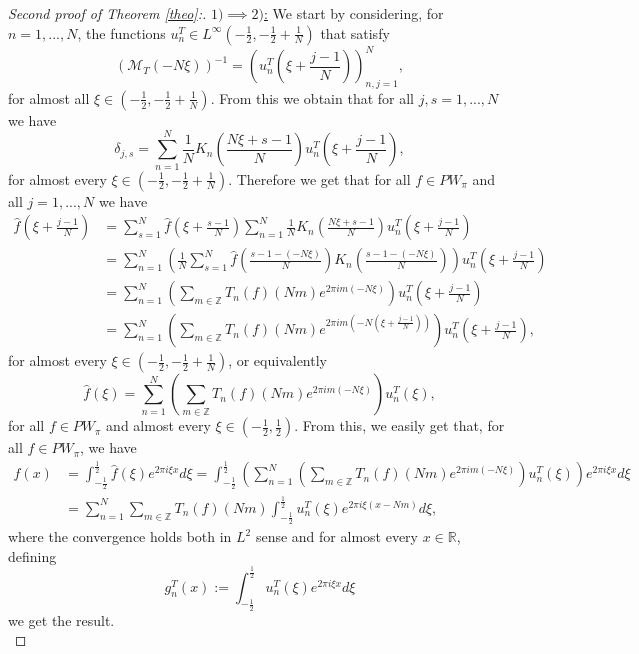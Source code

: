 \documentclass[reqno]{amsart}
\theoremstyle{plain}
\theoremstyle{definition}
\numberwithin{equation}{section}
\newcommand{\Z}{{\mathbb Z}}
\newcommand{\R}{{\mathbb R}}
\newcommand{\pa}[1]{\left(#1\right)}
\begin{document}
\begin{proof}[Second proof of Theorem \ref{theo}:] \quad
	
	\underline{$1)\implies 2)$:} We start by considering, for $n=1,...,N$, the functions 
    $u^T_n\in L^\infty\pa{-\frac{1}{2},-\frac{1}{2}+\frac{1}{N}}$ that satisfy
    $$\pa{\mathcal{M}_T\pa{-N \xi}}^{-1}=\pa{u^T_n\pa{\xi+\frac{j-1}{N}}}_{n,j=1}^N,$$
    for almost all $\xi\in \pa{-\frac{1}{2},-\frac{1}{2}+\frac{1}{N}}$. From this we obtain 
    that for all $j,s=1,...,N$ we have
    $$\delta_{j,s}=\sum_{n=1}^N \frac{1}{N} K_n\pa{\frac{N\xi+s-1}{N}}u^T_n\pa{\xi+\frac{j-1}{N}},$$
    for almost every $\xi\in \pa{-\frac{1}{2},-\frac{1}{2}+\frac{1}{N}}$. Therefore we get 
    that for all $f\in PW_\pi$ and all $j=1,...,N$ we have
    \begin{align*}
        \widehat{f}\pa{\xi+\frac{j-1}{N}}
        &=\sum_{s=1}^N \widehat{f}\pa{\xi+\frac{s-1}{N}}
        \sum_{n=1}^N \frac{1}{N} K_n\pa{\frac{N\xi+s-1}{N}}u^T_n\pa{\xi+\frac{j-1}{N}} \\
        &= \sum_{n=1}^N \pa{\frac{1}{N}\sum_{s=1}^N \widehat{f}\pa{\frac{s-1-(-N\xi)}{N}} K_n\pa{\frac{s-1-(-N\xi)}{N}}}
        u^T_n\pa{\xi+\frac{j-1}{N}} \\
        &=\sum_{n=1}^N \pa{\sum_{m\in\Z} T_n(f)(Nm) e^{2\pi i m (-N\xi)}} u^T_n\pa{\xi+\frac{j-1}{N}} \\
        &=\sum_{n=1}^N \pa{\sum_{m\in\Z} T_n(f)(Nm) e^{2\pi i m \pa{-N\pa{\xi+\frac{j-1}{N}}}}} u^T_n\pa{\xi+\frac{j-1}{N}},
    \end{align*}
    for almost every $\xi\in \pa{-\frac{1}{2},-\frac{1}{2}+\frac{1}{N}}$, or equivalently
    $$\widehat{f}(\xi)=\sum_{n=1}^N \pa{\sum_{m\in\Z} T_n(f)(Nm) e^{2\pi i m (-N\xi)}} u^T_n(\xi),$$
    for all $f\in PW_\pi$ and almost every $\xi\in\pa{-\frac{1}{2},\frac{1}{2}}$. From this, we 
    easily get that, for all $f\in PW_\pi$, we have
    \begin{align*}
        f(x)&=\int_{-\frac{1}{2}}^\frac{1}{2} \widehat{f}(\xi)e^{2\pi i\xi x}d\xi
        =\int_{-\frac{1}{2}}^\frac{1}{2} 
        \pa{\sum_{n=1}^N \pa{\sum_{m\in\Z} T_n(f)(Nm) e^{2\pi i m (-N\xi)}} u^T_n(\xi)}e^{2\pi i\xi x}d\xi \\
        &=\sum_{n=1}^N \sum_{m\in\Z}T_n(f)(Nm)
        \int_{-\frac{1}{2}}^\frac{1}{2} u^T_n(\xi) e^{2\pi i\xi(x-Nm)}d\xi,
    \end{align*}
    where the convergence holds both in $L^2$ sense and for almost every $x\in\R$, defining 
    $$g^T_n(x):=\int_{-\frac{1}{2}}^\frac{1}{2} u^T_n(\xi) e^{2\pi i\xi x}d\xi$$
    we get the result. \\
    

\end{proof}
\end{document}
